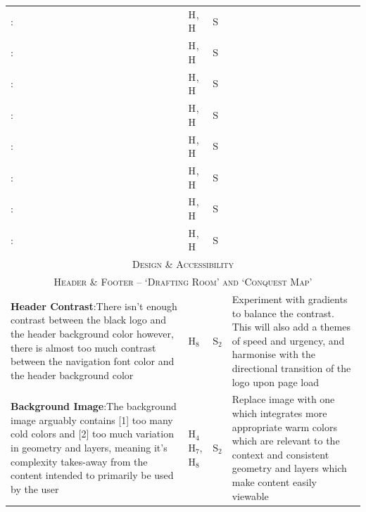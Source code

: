 \documentclass[11pt, english]{article}
\begin{document}
\begin{center}
\begin{longtable}{p{7.5cm}p{0.5cm}p{0.5cm}p{4cm}}
		\textbf{}:\newline  & $\mathrm{H_{}}$, $\mathrm{H_{}}$ & $\mathrm{S_{}}$ & \\
		\textbf{}:\newline  & $\mathrm{H_{}}$, $\mathrm{H_{}}$ & $\mathrm{S_{}}$ & \\
		\textbf{}:\newline  & $\mathrm{H_{}}$, $\mathrm{H_{}}$ & $\mathrm{S_{}}$ & \\
		\textbf{}:\newline  & $\mathrm{H_{}}$, $\mathrm{H_{}}$ & $\mathrm{S_{}}$ & \\
		\textbf{}:\newline  & $\mathrm{H_{}}$, $\mathrm{H_{}}$ & $\mathrm{S_{}}$ & \\
		\textbf{}:\newline  & $\mathrm{H_{}}$, $\mathrm{H_{}}$ & $\mathrm{S_{}}$ & \\
		\textbf{}:\newline  & $\mathrm{H_{}}$, $\mathrm{H_{}}$ & $\mathrm{S_{}}$ & \\
		\textbf{}:\newline  & $\mathrm{H_{}}$, $\mathrm{H_{}}$ & $\mathrm{S_{}}$ & \\
		\hline
		\hline
		\multicolumn{4}{c}{\textsc{Design \& Accessibility}}\\
		\hline
		\hline
		\multicolumn{4}{c}{\textsc{Header \& Footer -- `Drafting Room' and `Conquest Map'}}\\
		\hline
		\textbf{Header Contrast}:\newline There isn't enough contrast between the black logo and the header background color however, there is almost too much contrast between the navigation font color and the header background color & $\mathrm{H_{8}}$ & $\mathrm{S_{2}}$ & Experiment with gradients to balance the contrast. This will also add a themes of speed and urgency, and harmonise with the directional transition of the logo upon page load\\
		\textbf{Background Image}:\newline The background image arguably contains [1] too many cold colors and [2] too much variation in geometry and layers, meaning it's complexity takes-away from the content intended to primarily be used by the user & $\mathrm{H_{4}}$ $\mathrm{H_{7}}$, $\mathrm{H_{8}}$ & $\mathrm{S_{2}}$ & Replace image with one which integrates more appropriate warm colors which are relevant to the context and consistent geometry and layers which make content easily viewable\\

\end{longtable}
\end{center}
\end{document}

